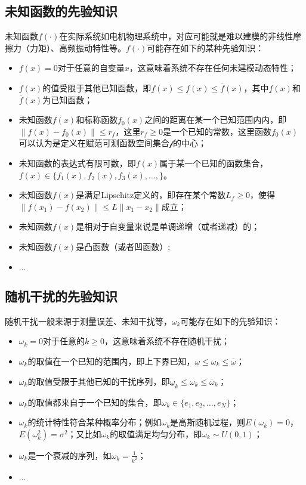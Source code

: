 \subsection{未知函数的先验知识}
\label{subsec:2.2.3}
未知函数$f(\cdot)$在实际系统如电机物理系统中，对应可能就是难以建模的非线性摩擦力（力矩）、高频振动特性等。$f(\cdot)$可能存在如下的某种先验知识：
\begin{itemize}
\item $f(x)=0$对于任意的自变量$x$，这意味着系统不存在任何未建模动态特性；
\item $f(x)$的值受限于其他已知函数，即$\underline{f}(x)\leq f(x)\leq\overline{f}(x)$，其中$\underline{f}(x)$和$\overline{f}(x)$为已知函数；
\item 未知函数$f(x)$和标称函数$f_{0}(x)$之间的距离在某一个已知范围内内，即$\|f(x)-f_{0}(x)\|\leq r_{f}$，这里$r_{f}\geq0$是一个已知的常数，这里函数$f_{0}(x)$可以认为是定义在赋范可测函数空间集合$\mathcal{f}$的中心；
\item 未知函数的表达式有限可数，即$f(x)$属于某一个已知的函数集合，$f(x)\in\{f_{1}(x),f_{2}(x),f_{3}(x),\dots,\}$。
\item 未知函数$f(x)$是满足Lipschitz定义的，即存在某个常数$L_{f}\geq0$，使得$\|f(x_{1})-f(x_{2})\|\leq L\|x_{1}-x_{2}\|$成立；
\item 未知函数$f(x)$是相对于自变量来说是单调递增（或者递减）的；
\item 未知函数$f(x)$是凸函数（或者凹函数）;
\item $\dots$
\end{itemize}
\subsection{随机干扰的先验知识}
\label{subsec:2.2.4}
随机干扰一般来源于测量误差、未知干扰等，$\omega_{k}$可能存在如下的先验知识：
\begin{itemize}%
\item $\omega_{k}=0$对于任意的$k\geq0$，这意味着系统不存在随机干扰；
\item $\omega_{k}$的取值在一个已知的范围内，即上下界已知，$\underline{\omega}\leq\omega_{k}\leq\overline{\omega}$；
\item $\omega_{k}$的取值受限于其他已知的干扰序列，即$\underline{\omega}_{k}\leq\omega_{k}\leq\overline{\omega}_{k}$；
\item $\omega_{k}$的取值都来自于一个已知的集合，即$\omega_{k}\in\{e_{1}, e_{2},\ldots,e_{N}\}$；
\item $\omega_{k}$的统计特性符合某种概率分布；例如$\omega_{k}$是高斯随机过程，则$E(\omega_{k})=0$，$E(\omega_{k}^{2})=\sigma^{2}$；又比如$\omega_{k}$的取值满足均匀分布，即$\omega_{k}\sim U(0,1)$；
\item $\omega_{k}$是一个衰减的序列，如$\omega_{k}=\frac1{k^{2}}$；
\item $\dots$
\end{itemize}

